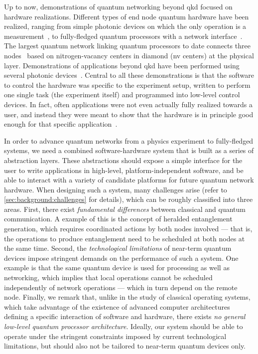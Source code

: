 Up to now, demonstrations of quantum networking beyond \acrshort{qkd} focused on hardware
realizations. Different types of end node quantum hardware have been realized, ranging from simple
photonic devices on which the only operation is a measurement~\cite{vallone_2015_satellite,
yin_2017_satellite}, to fully-fledged quantum processors with a network
interface~\cite{bernien_2013_heralded, humphreys_2018_delivery, pompili_2021_multinode,
moehring_2007_ion_traps, reiserer_2015_neutral_atoms}. The largest quantum network linking quantum
processors to date connects three nodes~\cite{pompili_2021_multinode} based on nitrogen-vacancy
centers in diamond (\acrshort{nv} centers) at the physical layer. Demonstrations of applications
beyond \acrshort{qkd} have been performed using several photonic
devices~\cite{barz_2012_demonstration, thalacker_2019_anonymous, bozzio_2020_coin,
ng_2012_noisystorage}. Central to all these demonstrations is that the software to control the
hardware was specific to the experiment setup, written to perform one single task (the experiment
itself) and programmed into low-level control devices. In fact, often applications were not even
actually fully realized towards a user, and instead they were meant to show that the hardware is in
principle good enough for that specific application~\cite{zhang_2022_diqkd,
liu_2022_photonic_diqkd}.

In order to advance quantum networks from a physics experiment to fully-fledged systems, we need a
combined software-hardware system that is built as a series of abstraction layers. These
abstractions should expose a simple interface for the user to write applications in high-level,
platform-independent software, and be able to interact with a variety of candidate platforms for
future quantum network hardware. When designing such a system, many challenges arise (refer to
\cref{sec:background:challenges} for details), which can be roughly classified into three areas.
First, there exist \emph{fundamental differences} between classical and quantum communication. A
example of this is the concept of heralded entanglement generation, which requires coordinated
actions by both nodes involved --- that is, the operations to produce entanglement need to be
scheduled at both nodes at the same time. Second, the \emph{technological limitations} of near-term
quantum devices impose stringent demands on the performance of such a system. One example is that
the same quantum device is used for processing as well as networking, which implies that local
operations cannot be scheduled independently of network operations --- which in turn depend on the
remote node. Finally, we remark that, unlike in the study of classical operating systems, which take
advantage of the existence of advanced computer architectures defining a specific interaction of
software and hardware, there exists \emph{no general low-level quantum processor architecture}.
Ideally, our system should be able to operate under the stringent constraints imposed by current
technological limitations, but should also not be tailored to near-term quantum devices only.


